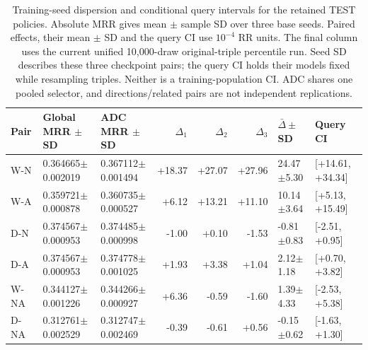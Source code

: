 \begin{table}[htbp]
\centering\footnotesize\setlength{\tabcolsep}{3pt}
\caption{Training-seed dispersion and conditional query intervals for the retained TEST policies. Absolute MRR gives mean $\pm$ sample SD over three base seeds. Paired effects, their mean $\pm$ SD and the query CI use $10^{-4}$ RR units. The final column uses the current unified 10,000-draw original-triple percentile run. Seed SD describes these three checkpoint pairs; the query CI holds their models fixed while resampling triples. Neither is a training-population CI. ADC shares one pooled selector, and directions/related pairs are not independent replications.}
\label{tab:selection-query-seed}
\begin{tabular}{lllrrrll}
\toprule
Pair & Global MRR $\pm$ SD & ADC MRR $\pm$ SD & $\Delta_1$ & $\Delta_2$ & $\Delta_3$ & $\bar\Delta\pm$ SD & Query CI\\
\midrule
W-N & 0.364665$\pm$0.002019 & 0.367112$\pm$0.001494 & +18.37 & +27.07 & +27.96 & 24.47$\pm$5.30 & [+14.61, +34.34]\\
W-A & 0.359721$\pm$0.000878 & 0.360735$\pm$0.000527 & +6.12 & +13.21 & +11.10 & 10.14$\pm$3.64 & [+5.13, +15.49]\\
D-N & 0.374567$\pm$0.000953 & 0.374485$\pm$0.000998 & -1.00 & +0.10 & -1.53 & -0.81$\pm$0.83 & [-2.51, +0.95]\\
D-A & 0.374567$\pm$0.000953 & 0.374778$\pm$0.001025 & +1.93 & +3.38 & +1.04 & 2.12$\pm$1.18 & [+0.70, +3.82]\\
W-NA & 0.344127$\pm$0.001226 & 0.344266$\pm$0.000927 & +6.36 & -0.59 & -1.60 & 1.39$\pm$4.33 & [-2.53, +5.38]\\
D-NA & 0.312761$\pm$0.002529 & 0.312747$\pm$0.002469 & -0.39 & -0.61 & +0.56 & -0.15$\pm$0.62 & [-1.63, +1.30]\\
\bottomrule
\end{tabular}
\end{table}
